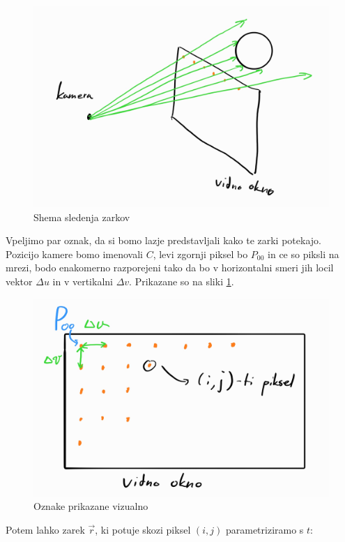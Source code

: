 \documentclass[12pt, a4paper]{article}
\begin{document}
\begin{figure}[H]
	\includegraphics[width=\textwidth]{shema_zarki}
	\caption{Shema sledenja zarkov}
\end{figure}

Vpeljimo par oznak, da si bomo lazje predstavljali kako te zarki potekajo. Pozicijo kamere bomo imenovali $C$,
levi zgornji piksel bo $P_{00}$ in ce so piksli na mrezi, bodo enakomerno razporejeni tako da bo v horizontalni
smeri jih locil vektor $\Delta u$ in v vertikalni $\Delta v$. Prikazane so na sliki \ref{fig:oznake}.

\begin{figure}[h]
	\centering
	\includegraphics[width=\textwidth]{vidno_okno}
	\caption{Oznake prikazane vizualno}
	\label{fig:oznake}
\end{figure}

Potem lahko zarek $\vec{r}$, ki potuje skozi piksel $(i,j)$ parametriziramo s $t$:
\end{document}
